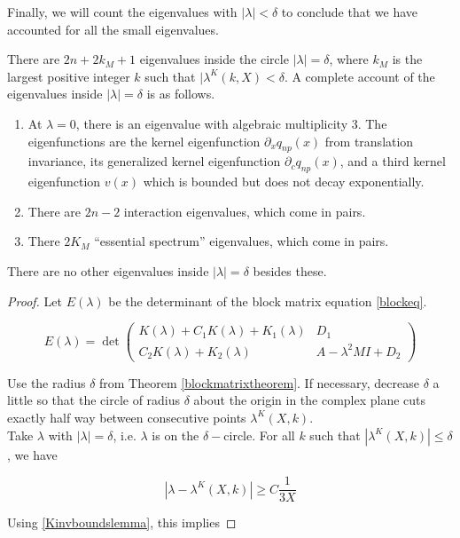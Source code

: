 \documentclass[thesis.tex]{subfiles}
\begin{document}
Finally, we will count the eigenvalues with $|\lambda| < \delta$ to conclude that we have accounted for all the small eigenvalues.  

\begin{lemma}\label{eigcount}
There are $2n + 2 k_M + 1$ eigenvalues inside the circle $|\lambda| = \delta$, where $k_M$ is the largest positive integer $k$ such that $|\lambda^K(k,X) < \delta$. A complete account of the eigenvalues inside $|\lambda| = \delta$ is as follows.
\begin{enumerate}
	\item At $\lambda = 0$, there is an eigenvalue with algebraic multiplicity 3. The eigenfunctions are the kernel eigenfunction $\partial_x q_{np}(x)$ from translation invariance, its generalized kernel eigenfunction $\partial_c q_{np}(x)$, and a third kernel eigenfunction $v(x)$ which is bounded but does not decay exponentially.
	\item There are $2n - 2$ interaction eigenvalues, which come in pairs.
	\item There $2 K_M$ ``essential spectrum'' eigenvalues, which come in pairs.
\end{enumerate}
There are no other eigenvalues inside $|\lambda| = \delta$ besides these.

\begin{proof}
Let $E(\lambda)$ be the determinant of the block matrix equation \ref{blockeq}.

\begin{equation}
E(\lambda) = \det 
\begin{pmatrix}
K(\lambda) + C_1 K(\lambda) + K_1(\lambda) & D_1 \\
C_2 K(\lambda) + K_2(\lambda) & A - \lambda^2 MI + D_2
\end{pmatrix}
\end{equation}

Use the radius $\delta$ from Theorem \ref{blockmatrixtheorem}. If necessary, decrease $\delta$ a little so that the circle of radius $\delta$ about the origin in the complex plane cuts exactly half way between consecutive points $\lambda^K(X, k)$.\\

Take $\lambda$ with $|\lambda| = \delta$, i.e. $\lambda$ is on the $\delta-$circle. For all $k$ such that $|\lambda^K(X, k)| \leq \delta$, we have

\[
| \lambda - \lambda^K(X, k)|  \geq C \frac{1}{3X}
\]

Using \ref{Kinvboundslemma}, this implies


\end{proof}
\end{lemma}
\end{document}
